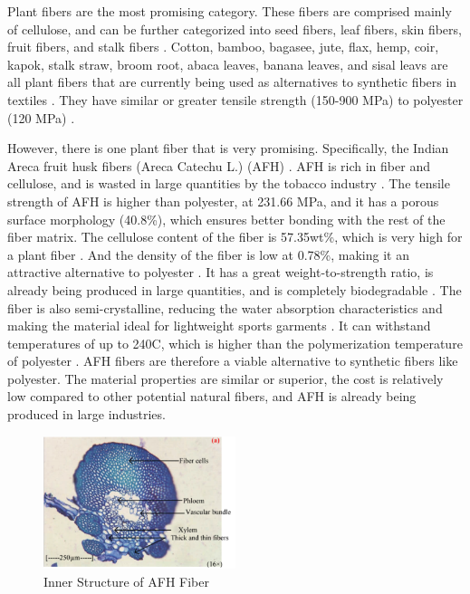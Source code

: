 \documentclass{article}
\begin{document}
Plant fibers are the most promising category. These fibers are comprised mainly of cellulose, and can be further categorized into seed fibers, leaf fibers, skin fibers, fruit fibers, and stalk fibers \autocite{naturalfiberprogressreport}. Cotton, bamboo, bagasee, jute, flax, hemp, coir, kapok, stalk straw, broom root, abaca leaves, banana leaves, and sisal leavs are all plant fibers that are currently being used as alternatives to synthetic fibers in textiles \autocite{naturalfiberprogressreport}. They have similar or greater tensile strength (150-900 MPa) to polyester (120 MPa) \autocite{polyesterstrength}\autocite{naturalfiberreview}.

However, there is one plant fiber that is very promising. Specifically, the Indian Areca fruit husk fibers (Areca Catechu L.) (AFH) \autocite{afhfiber}. AFH is rich in fiber and cellulose, and is wasted in large quantities by the tobacco industry \autocite{afhfiber}. The tensile strength of AFH is higher than polyester, at 231.66 MPa, and it has a porous surface morphology (40.8\%), which ensures better bonding with the rest of the fiber matrix. The cellulose content of the fiber is 57.35wt\%, which is very high for a plant fiber \autocite{afhfiber}. And the density of the fiber is low at 0.78\%, making it an attractive alternative to polyester \autocite{afhfiber}. It has a great weight-to-strength ratio, is already being produced in large quantities, and is completely biodegradable \autocite{afhfiber}. The fiber is also semi-crystalline, reducing the water absorption characteristics and making the material ideal for lightweight sports garments \autocite{afhfiber}. It can withstand temperatures of up to 240C, which is higher than the polymerization temperature of polyester \autocite{afhfiber}. AFH fibers are therefore a viable alternative to synthetic fibers like polyester. The material properties are similar or superior, the cost is relatively low compared to other potential natural fibers, and AFH is already being produced in large industries.

\begin{figure}
  \centering
  \includegraphics[width=0.5\textwidth]{assets/afh_fiber_structure.png}
  \caption{Inner Structure of AFH Fiber \protect\autocite{afhfiber}}
  \label{fig:afhstructure}
\end{figure}
\end{document}
